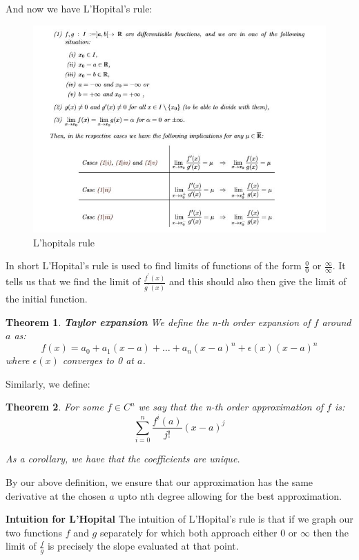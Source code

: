 \documentclass[titlepage]{article}
\newtheorem{theorem}{Theorem}[section]
\begin{document}
And now we have L'Hopital's rule:

\begin{figure}[H]
    \centering
    \includegraphics{epflLectureNotes/analysis/figures/lhopital.JPG}
    \caption{L'hopitals rule}
    \label{fig:my_label}
\end{figure}

In short L'Hopital's rule is used to find limits of functions of the form $\frac{0}{0}$ or $\frac{\infty}{\infty}$. It tells us that we find the limit of $\frac{f^{\prime}(x)}{g^{\prime}(x)}$ and this should also then give the limit of the initial function. 

\begin{theorem}\textbf{Taylor expansion}
We define the n-th order expansion of $f$ around $a$ as:
$$f(x) = a_{0} + a_{1}(x-a) + \hdots + a_{n}(x-a)^{n} + \epsilon(x)(x-a)^{n}$$ where $\epsilon(x)$ converges to 0 at $a$. 
\end{theorem}

Similarly, we define:

\begin{theorem}
For some $f \in C^{n}$ we say that the n-th order approximation of $f$ is:
$$\sum_{i=0}^{n}\frac{f^{i}(a)}{j!}(x-a)^j$$

As a corollary, we have that the coefficients are unique. 
\end{theorem}

By our above definition, we ensure that our approximation has the same derivative at the chosen $a$ upto nth degree allowing for the best approximation. 

\begin{tcolorbox}\textbf{Intuition for L'Hopital}
The intuition of L'Hopital's rule is that if we graph our two functions $f$ and $g$ separately for which both approach either $0$ or $\infty$ then the limit of $\frac{f}{g}$ is precisely the slope evaluated at that point. 
\end{tcolorbox}
\end{document}

